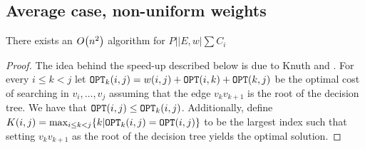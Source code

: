 \subsection{Average case, non-uniform weights}
\begin{theorem}
    There exists an $O\mathopen{}\left( n^2 \right)$ algorithm for $P||E, w|\sum C_i$
    \begin{proof}
        
The idea behind the speed-up described below is due to Knuth \cite{Knuth1973} and \cite{EffDPusingQI}. For every $i\leq k< j$ let $\texttt{OPT}_k\mathopen{}\left( i,j \right) = w\mathopen{}\left( i,j \right) + \texttt{OPT}\mathopen{}\left( i, k \right) + \texttt{OPT}\mathopen{}\left( k, j \right)$ be the optimal cost of searching in $v_i,\dots,v_j$ assuming that the edge $v_kv_{k+1}$ is the root of the decision tree. We have that $\texttt{OPT}\mathopen{}\left( i,j \right)\leq \texttt{OPT}_k\mathopen{}\left( i,j \right)$. Additionally, define 
$K\mathopen{}\left( i,j \right) = \max_{i\leq k< j}\mathopen{}\left\{ k|\texttt{OPT}_k\mathopen{}\left( i,j \right)=\texttt{OPT}\mathopen{}\left( i,j \right) \right\}$ to be the largest index such that setting $v_kv_{k+1}$ as the root of the decision tree yields the optimal solution. 


\end{proof}
\end{theorem}

